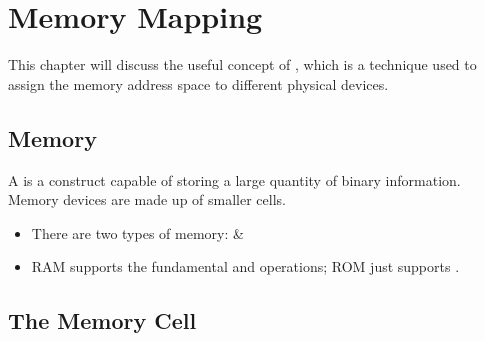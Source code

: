 \chapter{Memory Mapping}

This chapter will discuss the useful concept of , which is a technique used to assign the memory address space to different physical devices.

\section{Memory}

A  is a construct capable of storing a large quantity of binary information. Memory devices are made up of smaller cells.
\begin{itemize}
	\item There are two types of memory:  \& 
	\item  RAM supports the fundamental  and  operations; ROM just supports .
\end{itemize}

\section{The Memory Cell}

